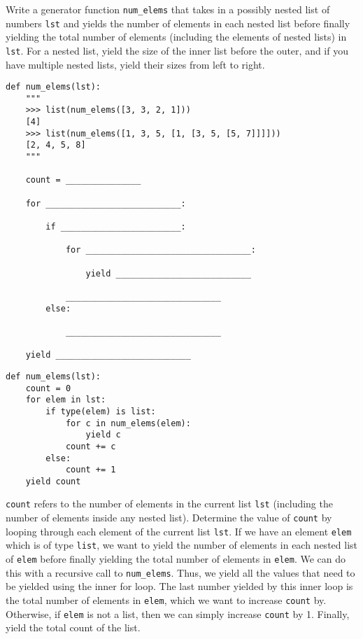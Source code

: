\question
Write a generator function \lstinline{num_elems} that takes in a possibly nested list of numbers \lstinline{lst} and yields the number of elements in each nested list before finally yielding the total number of elements (including the elements of nested lists) in \lstinline{lst}. For a nested list, yield the size of the inner list before the outer, and if you have multiple nested lists, yield their sizes from left to right.

\begin{lstlisting}
def num_elems(lst):
    """
    >>> list(num_elems([3, 3, 2, 1]))
    [4]
    >>> list(num_elems([1, 3, 5, [1, [3, 5, [5, 7]]]]))
    [2, 4, 5, 8]
    """

    count = _______________

    for ___________________________:

        if ________________________:

            for _________________________________:

                yield ___________________________

            _______________________________
        else:

            _______________________________

    yield ___________________________
\end{lstlisting} 
\begin{solution}
\begin{lstlisting}
def num_elems(lst):
    count = 0
    for elem in lst:
        if type(elem) is list:
            for c in num_elems(elem):
                yield c
            count += c
        else:
            count += 1
    yield count
\end{lstlisting}

\lstinline{count} refers to the number of elements in the current list \lstinline{lst} (including the number of elements inside any nested list). Determine the value of \lstinline{count} by looping through each element of the current list \lstinline{lst}. If we have an element \lstinline{elem} which is of type \lstinline{list}, we want to yield the number of elements in each nested list of \lstinline{elem} before finally yielding the total number of elements in \lstinline{elem}. We can do this with a recursive call to \lstinline{num_elems}. Thus, we yield all the values that need to be yielded using the inner for loop. The last number yielded by this inner loop is the total number of elements in \lstinline{elem}, which we want to increase \lstinline{count} by. Otherwise, if \lstinline{elem} is not a list, then we can simply increase \lstinline{count} by 1. Finally, yield the total count of the list.
\end{solution}

